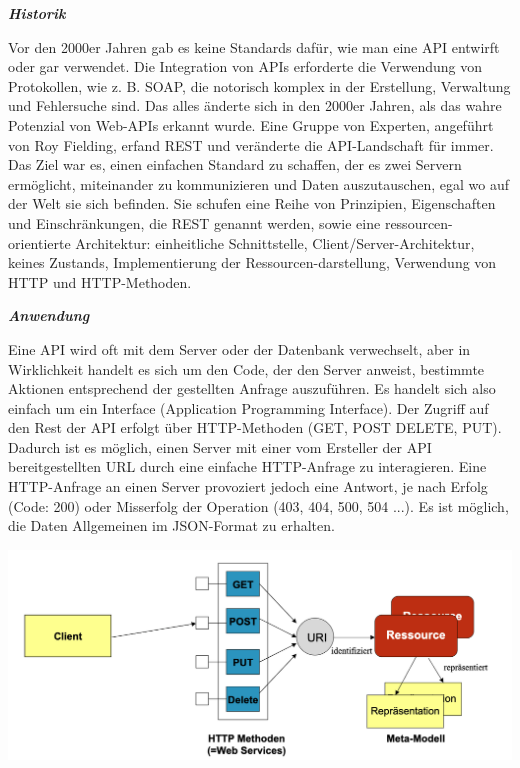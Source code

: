 \textit{\textbf{Historik}}

Vor den 2000er Jahren gab es keine Standards dafür, wie man eine API entwirft oder gar verwendet. Die Integration von APIs erforderte die Verwendung von Protokollen, wie z. B. SOAP, die notorisch komplex in der Erstellung, Verwaltung und Fehlersuche sind. Das alles änderte sich in den 2000er Jahren, als das wahre Potenzial von Web-APIs erkannt wurde. Eine Gruppe von Experten, angeführt von Roy Fielding, erfand REST und veränderte die API-Landschaft für immer.
Das Ziel war es, einen einfachen Standard zu schaffen, der es zwei Servern ermöglicht, miteinander zu kommunizieren und Daten auszutauschen, egal wo auf der Welt sie sich befinden. Sie schufen eine Reihe von Prinzipien, Eigenschaften und Einschränkungen, die REST genannt werden, sowie eine ressourcen-orientierte Architektur: einheitliche Schnittstelle, Client/Server-Architektur, keines Zustands, Implementierung der Ressourcen-darstellung, Verwendung von \ac{HTTP} und HTTP-Methoden.

\textit{\textbf{Anwendung}}

Eine API wird oft mit dem Server oder der Datenbank verwechselt, aber in Wirklichkeit handelt es sich um den Code, der den Server anweist, bestimmte Aktionen entsprechend der gestellten Anfrage auszuführen. Es handelt sich also einfach um ein Interface (Application Programming Interface).
Der Zugriff auf den Rest der API erfolgt über HTTP-Methoden (GET, POST DELETE, PUT). Dadurch ist es möglich, einen Server mit einer vom Ersteller der API bereitgestellten URL durch eine einfache HTTP-Anfrage zu interagieren. Eine HTTP-Anfrage an einen Server provoziert jedoch eine Antwort, je nach Erfolg (Code: 200) oder Misserfolg der Operation (403, 404, 500, 504 ...). Es ist möglich, die Daten Allgemeinen im JSON-Format zu erhalten.

\begin{center}
\includegraphics[scale=.3]{images/Aufbau_eine REST-basierten_Web_Services_Architektur} \cite{alda}
\end{center}

